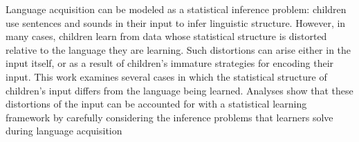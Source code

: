Language acquisition can be modeled as a statistical inference problem: children use sentences and sounds in their input to infer linguistic structure. However, in many cases, children learn from data whose statistical structure is distorted relative to the language they are learning.  Such distortions can arise either in the input itself, or as a result of children's immature strategies for encoding their input.  This work examines several cases in which the statistical structure of children's input differs from the language being learned.  Analyses show that these distortions of the input can be accounted for with a statistical learning framework by carefully considering the inference problems that learners solve during language acquisition

